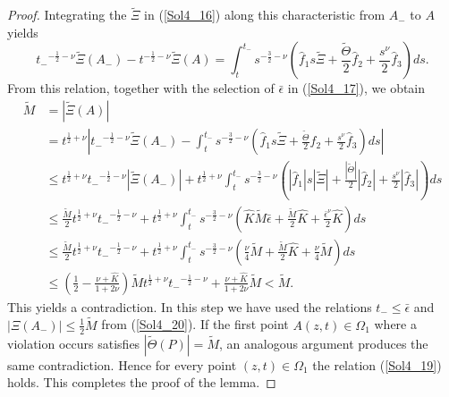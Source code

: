 \documentclass[3p,11pt]{elsarticle}
\numberwithin{equation}{section}
\begin{document}
\begin{proof}
Integrating the $\widetilde\Xi$ in (\ref{Sol4_16}) along this characteristic from $A_{-}$ to $A$ yields
\begin{equation*}\label{Sol4_21}
{t_-}^{-\frac{1}{2}-\nu}\widetilde\Xi(A_-)-t^{-\frac{1}{2}-\nu}\widetilde\Xi(A)=\int_t^{t_-}s^{-\frac{3}{2}-\nu}\left(\hat f_1s\widetilde\Xi+\frac{\widetilde \Theta}{2}\hat f_2+\frac{s^{\nu}}{2}\hat f_{3}\right)ds.
\end{equation*}
From this relation, together with the selection of $\bar{\epsilon}$ in (\ref{Sol4_17}), we obtain
\begin{equation*}\label{Sol4_22}
    \begin{split}
        \widetilde M&=|\widetilde\Xi(A)|\\
                &=t^{\frac{1}{2}+\nu}\left|{t_-}^{-\frac{1}{2}-\nu}\widetilde\Xi(A_-)-\int_t^{t_-}s^{-\frac{3}{2}-\nu}\left(\hat f_1s\widetilde\Xi+\frac{\widetilde \Theta}{2}\hat f_2+\frac{s^{\nu}}{2}\hat f_{3}\right)ds\right|\\
                &\leq t^{\frac{1}{2}+\nu}{t_-}^{-\frac{1}{2}-\nu}|\widetilde\Xi(A_-)|+t^{\frac{1}{2}+\nu}\int_t^{t_-}s^{-\frac{3}{2}-\nu}\left(|\hat f_1|s|\widetilde\Xi|+\frac{|\widetilde \Theta|}{2}|\hat f_2|+\frac{s^{\nu}}{2}|\hat f_{3}|\right)ds\\
                &\leq \frac{\widetilde M}{2}t^{\frac{1}{2}+\nu}{t_-}^{-\frac{1}{2}-\nu}+t^{\frac{1}{2}+\nu}\int_t^{t_-}s^{-\frac{3}{2}-\nu}\left(\hat K \widetilde M \bar\epsilon+\frac{\widetilde M}{2}\hat K+\frac{{\bar\epsilon}^{\nu}}{2}\hat K\right)ds\\
                &\leq \frac{\widetilde M}{2}t^{\frac{1}{2}+\nu}{t_-}^{-\frac{1}{2}-\nu}+t^{\frac{1}{2}+\nu}\int_t^{t_-}s^{-\frac{3}{2}-\nu}\left(\frac{\nu}{4} \widetilde M+\frac{\widetilde M}{2}\hat K+\frac{\nu}{4}\widetilde M\right)ds\\
                &\leq \left( \frac{1}{2}-\frac{\nu+\hat K}{1+2\nu}\right)\widetilde M t^{\frac{1}{2}+\nu}{t_-}^{-\frac{1}{2}-\nu}+ \frac{\nu+\hat K}{1+2\nu} \widetilde M <\widetilde M.
    \end{split}
\end{equation*}
This yields a contradiction. In this step we have used the relations $t_-\le \bar{\epsilon}$ and $|\Xi(A_{-})|\le \frac{1}{2}\widetilde M$ from (\ref{Sol4_20}). If the first point $A(z,t)\in \Omega_{1}$ where a violation occurs satisfies $|\tilde \Theta(P)|=\widetilde M$, an analogous argument produces the same contradiction. Hence for every point $(z,t)\in \Omega_{1}$ the relation (\ref{Sol4_19}) holds.
This completes the proof of the lemma.
\end{proof}
\end{document}
